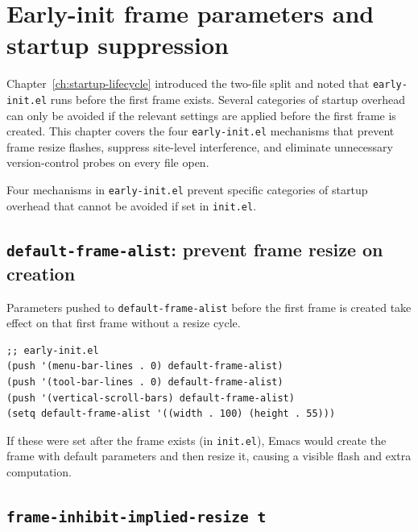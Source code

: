 \chapter{Early-init frame parameters and startup suppression}
\label{ch:early-init-frame}
\minitoc\label{early-init-frame-parameters-and-startup-suppression}

Chapter~\ref{ch:startup-lifecycle} introduced the two-file split and
noted that \texttt{early-init.el} runs before the first frame exists.
Several categories of startup overhead can only be avoided if the
relevant settings are applied before the first frame is created.
This chapter covers the four \texttt{early-init.el} mechanisms that
prevent frame resize flashes, suppress site-level interference, and
eliminate unnecessary version-control probes on every file open.

Four mechanisms in \texttt{early-init.el} prevent specific categories of startup overhead that cannot be avoided if set in \texttt{init.el}.

\section{\texttt{default-frame-alist}: prevent frame resize on creation}\label{default-frame-alist-prevent-frame-resize-on-creation}

Parameters pushed to \texttt{default-frame-alist} before the first frame is created take effect on that first frame without a resize cycle.

\begin{verbatim}
;; early-init.el
(push '(menu-bar-lines . 0) default-frame-alist)
(push '(tool-bar-lines . 0) default-frame-alist)
(push '(vertical-scroll-bars) default-frame-alist)
(setq default-frame-alist '((width . 100) (height . 55)))
\end{verbatim}

If these were set after the frame exists (in \texttt{init.el}), Emacs would create the frame with default parameters and then resize it, causing a visible flash and extra computation.

\section{\texttt{frame-inhibit-implied-resize t}}\label{frame-inhibit-implied-resize-t}

